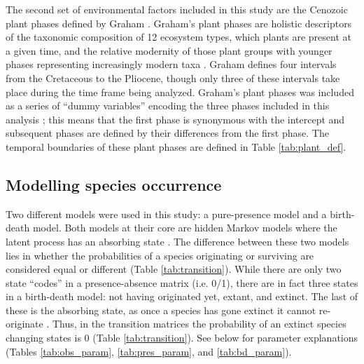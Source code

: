 The second set of environmental factors included in this study are the Cenozoic plant phases defined by Graham \citep{Graham2011a}. Graham's plant phases are holistic descriptors of the taxonomic composition of 12 ecosystem types, which plants are present at a given time, and the relative modernity of those plant groups with younger phases representing increasingly modern taxa \citep{Graham2011a}. Graham \citep{Graham2011a} defines four intervals from the Cretaceous to the Pliocene, though only three of these intervals take place during the time frame being analyzed. Graham's plant phases was included as a series of ``dummy variables'' encoding the three phases included in this analysis \citep{Gelman2007}; this means that the first phase is synonymous with the intercept and subsequent phases are defined by their differences from the first phase. The temporal boundaries of these plant phases are defined in Table \ref{tab:plant_def}.


\subsection*{Modelling species occurrence}
Two different models were used in this study: a pure-presence model and a birth-death model. Both models at their core are hidden Markov models where the latent process has an absorbing state \citep{Allen2011}. The difference between these two models lies in whether the probabilities of a species originating or surviving are considered equal or different (Table \ref{tab:transition}). While there are only two state ``codes'' in a presence-absence matrix (i.e. 0/1), there are in fact three states in a birth-death model: not having originated yet, extant, and extinct. The last of these is the absorbing state, as once a species has gone extinct it cannot re-originate \citep{Allen2011}. Thus, in the transition matrices the probability of an extinct species changing states is 0 (Table \ref{tab:transition}). See below for parameter explanations (Tables \ref{tab:obs_param}, \ref{tab:pres_param}, and \ref{tab:bd_param}).

